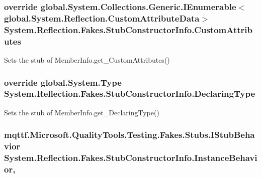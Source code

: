 \hypertarget{class_system_1_1_reflection_1_1_fakes_1_1_stub_constructor_info_a13ef5470b2d893000e19577eae28a05d}{
\subsubsection[{Custom\-Attributes}]{\setlength{\rightskip}{0pt plus 5cm}override global.\-System.\-Collections.\-Generic.\-I\-Enumerable$<$global.\-System.\-Reflection.\-Custom\-Attribute\-Data$>$ System.\-Reflection.\-Fakes.\-Stub\-Constructor\-Info.\-Custom\-Attributes\hspace{0.3cm}{\ttfamily [get]}}}\label{class_system_1_1_reflection_1_1_fakes_1_1_stub_constructor_info_a13ef5470b2d893000e19577eae28a05d}


Sets the stub of Member\-Info.\-get\-\_\-\-Custom\-Attributes()

\hypertarget{class_system_1_1_reflection_1_1_fakes_1_1_stub_constructor_info_ae0c4a7f181f756f446ead28b7fcfbf93}{
\subsubsection[{Declaring\-Type}]{\setlength{\rightskip}{0pt plus 5cm}override global.\-System.\-Type System.\-Reflection.\-Fakes.\-Stub\-Constructor\-Info.\-Declaring\-Type\hspace{0.3cm}{\ttfamily [get]}}}\label{class_system_1_1_reflection_1_1_fakes_1_1_stub_constructor_info_ae0c4a7f181f756f446ead28b7fcfbf93}


Sets the stub of Member\-Info.\-get\-\_\-\-Declaring\-Type()

\hypertarget{class_system_1_1_reflection_1_1_fakes_1_1_stub_constructor_info_a85d8b7ef8db769246106cd95c69c610b}{
\subsubsection[{Instance\-Behavior}]{\setlength{\rightskip}{0pt plus 5cm}mqttf.\-Microsoft.\-Quality\-Tools.\-Testing.\-Fakes.\-Stubs.\-I\-Stub\-Behavior System.\-Reflection.\-Fakes.\-Stub\-Constructor\-Info.\-Instance\-Behavior\hspace{0.3cm}{\ttfamily [get]}, {\ttfamily [set]}}}\label{class_system_1_1_reflection_1_1_fakes_1_1_stub_constructor_info_a85d8b7ef8db769246106cd95c69c610b}


